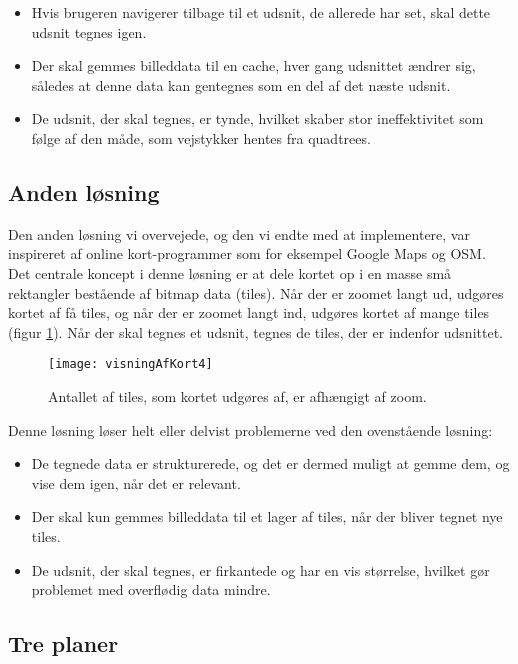 \begin{itemize}
	\item Hvis brugeren navigerer tilbage til et udsnit, de allerede har set, skal dette udsnit tegnes igen.
	\item Der skal gemmes billeddata til en cache, hver gang udsnittet ændrer sig, således at denne data kan gentegnes som en del af det næste udsnit.
	\item De udsnit, der skal tegnes, er tynde, hvilket skaber stor ineffektivitet som følge af den måde, som vejstykker hentes fra quadtrees.
\end{itemize}

\newpage
\subsection{Anden løsning}
\label{subsec:andenLoesning}

Den anden løsning vi overvejede, og den vi endte med at implementere, var inspireret af online kort-programmer som for eksempel Google Maps og OSM. Det centrale koncept i denne løsning er at dele kortet op i en masse små rektangler bestående af bitmap data (tiles). Når der er zoomet langt ud, udgøres kortet af få tiles, og når der er zoomet langt ind, udgøres kortet af mange tiles (figur \ref{figur:visningAfKort4}). Når der skal tegnes et udsnit, tegnes de tiles, der er indenfor udsnittet.

\begin{figure}[!ht]
	\centering
	\texttt{[image: visningAfKort4]}
	\captionsetup{width=0.8\textwidth}
	\caption{Antallet af tiles, som kortet udgøres af, er afhængigt af zoom.}
	\label{figur:visningAfKort4}
\end{figure}

Denne løsning løser helt eller delvist problemerne ved den ovenstående løsning:

\begin{itemize}
	\item De tegnede data er strukturerede, og det er dermed muligt at gemme dem, og vise dem igen, når det er relevant.
	\item Der skal kun gemmes billeddata til et lager af tiles, når der bliver tegnet nye tiles.
	\item De udsnit, der skal tegnes, er firkantede og har en vis størrelse, hvilket gør problemet med overflødig data mindre.
\end{itemize}

\subsection{Tre planer}
\label{subsec:trePlaner}

